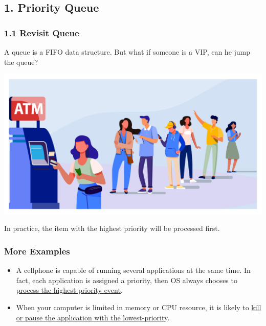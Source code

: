 \documentclass[aspectratio=169, 14pt]{beamer}
\begin{document}
{
    \begin{frame}
        \section{\textcolor{darkmidnightblue}{1. Priority Queue}}
    \end{frame}
}


\begin{frame}
    \frametitle{1.1 Revisit Queue}
A queue is a FIFO data structure. But what if someone is a VIP, can he jump the queue?
    
\begin{center}
    \includegraphics[height=.4\paperheight]{week4/atm}
\end{center} 
In practice, the item with the highest \alert{priority} will be processed first.
\end{frame}

\begin{frame}
    \frametitle{More Examples}

\begin{itemize}
    \item {} A cellphone is capable of running several applications at the same time. In fact, each application is assigned a priority, then OS always chooses to \underline{process the highest-priority event}.
    \item {} When your computer is limited in memory or CPU resource, it is likely to \underline{kill or pause the application with the lowest-priority}.
\end{itemize}

\end{frame}
\end{document}
